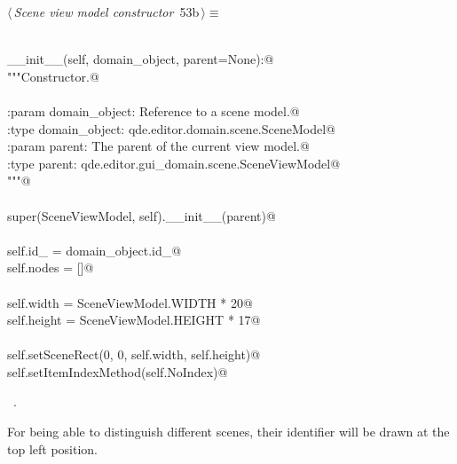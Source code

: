 \documentclass[
    a4paper,      %
    10pt,         %
    openright,    %
    notitlepage,  %
    parskip=half, %
]{scrreprt}       %
\theoremstyle{definition}                    %
\begin{document}
\begin{flushleft} \small
\begin{minipage}{\linewidth}\label{scrap81}\raggedright\small
{} $\langle\,${\itshape Scene view model constructor}\nobreak\ {\footnotesize {53b}}$\,\rangle\equiv$
\vspace{-1exm}
\begin{list}{}{} \item
\mbox{}\lstinline@@\\
\mbox{}\lstinline@def __init__(self, domain_object, parent=None):@\\
\mbox{}\lstinline@   """Constructor.@\\
\mbox{}\lstinline@@\\
\mbox{}\lstinline@   :param domain_object: Reference to a scene model.@\\
\mbox{}\lstinline@   :type  domain_object: qde.editor.domain.scene.SceneModel@\\
\mbox{}\lstinline@   :param parent:        The parent of the current view model.@\\
\mbox{}\lstinline@   :type parent:         qde.editor.gui_domain.scene.SceneViewModel@\\
\mbox{}\lstinline@   """@\\
\mbox{}\lstinline@@\\
\mbox{}\lstinline@   super(SceneViewModel, self).__init__(parent)@\\
\mbox{}\lstinline@@\\
\mbox{}\lstinline@   self.id_ = domain_object.id_@\\
\mbox{}\lstinline@   self.nodes = []@\\
\mbox{}\lstinline@@\\
\mbox{}\lstinline@   self.width = SceneViewModel.WIDTH * 20@\\
\mbox{}\lstinline@   self.height = SceneViewModel.HEIGHT * 17@\\
\mbox{}\lstinline@@\\
\mbox{}\lstinline@   self.setSceneRect(0, 0, self.width, self.height)@\\
\mbox{}\lstinline@   self.setItemIndexMethod(self.NoIndex)@\\
\mbox{}\lstinline@@{\NWsep}
\end{list}
\vspace{-1.5ex}
\footnotesize
\begin{list}{}{\setlength{\itemsep}{-\parsep}\setlength{\itemindent}{-\leftmargin}}
\item \NWtxtMacroRefIn\ .

\item{}
\end{list}
\end{minipage}\vspace{4ex}
\end{flushleft}
For being able to distinguish different scenes, their identifier will be drawn
at the top left position.
\end{document}
